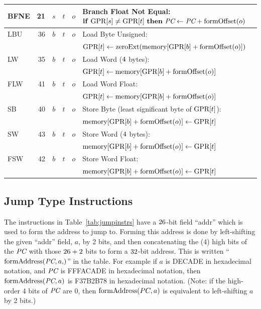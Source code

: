 \documentclass[11pt,letterpaper]{article}
\newcommand{\tabref}[1]{Table~\ref{#1}}  %
\newcommand{\IFO}[2]{\textrm{\textbf{if} \ensuremath{#1} \textbf{then} \ensuremath{#2} }}
\begin{document}
\begin{table}[htbp]
\begin{tabular}{|l|r|c|c|c|p{11cm}|}
\hline
BFNE  & 21    &$s$ &$t$ & $o$ & Branch Float Not Equal: $\IFO{\GPR{s} \neq \GPR{t}}{\PC \GETS \PC + \FORMOFFSET{o}}$ \\
\hline
LBU  & 36   &$b$ &$t$ & $o$ & Load Byte Unsigned: \\
     &      &    &    &     & $\textrm{GPR[}t\textrm{]} \leftarrow \textrm{zeroExt}(\textrm{memory}[\textrm{GPR[}b\textrm{]} + \textrm{formOffset}(o)])$ \\
\hline
LW   & 35   &$b$ &$t$ & $o$ & Load Word ($4$ bytes): \\
     &      &    &    &     & $\textrm{GPR[}t\textrm{]} \leftarrow \textrm{memory}[\textrm{GPR[}b\textrm{]} + \textrm{formOffset}(o)]$ \\
\hline
FLW   & 41   &$b$ &$t$ & $o$ & Load Word Float: \\
     &      &    &    &     & $\textrm{GPR[}t\textrm{]} \leftarrow \textrm{memory}[\textrm{GPR[}b\textrm{]} + \textrm{formOffset}(o)]$ \\
\hline
SB   & 40   &$b$ &$t$ & $o$ & Store Byte (least significant byte of $\textrm{GPR[}t\textrm{]}$): \\
     &      &    &    &     & $\textrm{memory}[\textrm{GPR[}b\textrm{]} + \textrm{formOffset}(o)] \leftarrow \textrm{GPR[}t\textrm{]}$ \\
\hline
SW   & 43   &$b$ &$t$ & $o$ & Store Word ($4$ bytes): \\
     &      &    &    &     & $\textrm{memory}[\textrm{GPR[}b\textrm{]} + \textrm{formOffset}(o)] \leftarrow \textrm{GPR[}t\textrm{]}$ \\
\hline
FSW  & 42   &$b$ &$t$ & $o$ & Store Word Float: \\
     &      &    &    &     & $\textrm{memory}[\textrm{GPR[}b\textrm{]} + \textrm{formOffset}(o)] \leftarrow \textrm{GPR[}t\textrm{]}$ \\
\hline
\end{tabular}
\end{table}

\subsection{Jump Type Instructions}

The instructions in \tabref{tab:jumpinstrs} have a $26$-bit field ``addr''
which is used to form the address to jump to.
Forming this address is done by left-shifting the given ``addr''
field, $a$, by 2 bits,
and then concatenating the (4) high bits of the $\textit{PC}$ with those
$26+2$ bits to form a $32$-bit address.
This is written ``$\FORMADDRESS{\PC,a}$'' in the table.
For example if $a$ is DECADE in hexadecimal notation, and $\textit{PC}$ is
FFFACADE in hexadecimal notation, then $\textrm{formAddress}(\textit{PC},a)$ is F37B2B78
in hexadecimal notation. (Note: if the high-order 4 bits of $\textit{PC}$
are 0, then $\textrm{formAddress}(PC,a)$ is equivalent to left-shifting $a$
by 2 bits.)
\end{document}
